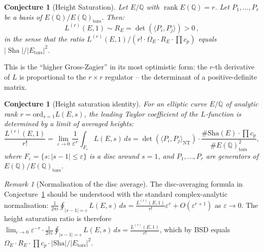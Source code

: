 \documentclass[aps,prd,twocolumn,superscriptaddress,nofootinbib]{revtex4-2}
\newtheorem{conjecture}[theorem]{Conjecture}
\theoremstyle{definition}
\theoremstyle{remark}
\newtheorem{remark}[theorem]{Remark}
\DeclareMathOperator{\rank}{rank}
\DeclareMathOperator{\Sha}{Sha}
\begin{document}
\begin{conjecture}[Height Saturation]
\label{conj:height_saturation}
Let $E/\mathbb{Q}$ with $\rank E(\mathbb{Q}) = r$. Let $P_1, \ldots, P_r$ be a basis of $E(\mathbb{Q})/E(\mathbb{Q})_{\mathrm{tors}}$. Then:
\begin{equation}
L^{(r)}(E,1) \sim R_E = \det\!\left(\langle P_i, P_j \rangle\right) > 0\,,
\label{eq:height_saturation}
\end{equation}
in the sense that the ratio $L^{(r)}(E,1)/(r! \cdot \Omega_E \cdot R_E \cdot \prod c_p)$ equals $|\Sha|/|E_{\mathrm{tors}}|^2$.
\end{conjecture}

This is the ``higher Gross-Zagier'' in its most optimistic form: the $r$-th derivative of $L$ is proportional to the $r \times r$ regulator -- the determinant of a positive-definite matrix.

\begin{conjecture}[Height saturation identity]
\label{conj:height-saturation}
For an elliptic curve $E/\mathbb{Q}$ of analytic rank $r = \mathrm{ord}_{s=1} L(E,s)$, the leading Taylor coefficient of the $L$-function is determined by a limit of averaged heights:
\[
\frac{L^{(r)}(E, 1)}{r!} = \lim_{\varepsilon \to 0} \frac{1}{\varepsilon^r} \int_{F_\varepsilon} L(E, s) \, ds = \det(\langle P_i, P_j \rangle_{\mathrm{NT}}) \cdot \frac{\#\mathrm{Sha}(E) \cdot \prod c_p}{\#E(\mathbb{Q})_{\mathrm{tors}}^2},
\]
where $F_\varepsilon = \{s : |s - 1| \leq \varepsilon\}$ is a disc around $s = 1$, and $P_1, \ldots, P_r$ are generators of $E(\mathbb{Q}) / E(\mathbb{Q})_{\mathrm{tors}}$.
\end{conjecture}

\begin{remark}[Normalisation of the disc average]\label{rem:disc-normalisation}
The disc-averaging formula in Conjecture~\ref{conj:height-saturation} should be understood with the standard complex-analytic normalisation: $\frac{1}{2\pi i} \oint_{|s-1|=\varepsilon} L(E,s)\, ds = \frac{L^{(r)}(E,1)}{r!} \varepsilon^r + O(\varepsilon^{r+1})$ as $\varepsilon \to 0$. The height saturation ratio is therefore $\lim_{\varepsilon \to 0} \varepsilon^{-r} \cdot \frac{1}{2\pi i} \oint_{|s-1|=\varepsilon} L(E,s)\, ds = \frac{L^{(r)}(E,1)}{r!}$, which by BSD equals $\Omega_E \cdot R_E \cdot \prod c_p \cdot |\mathrm{Sha}| / |E_{\mathrm{tors}}|^2$.
\end{remark}
\end{document}
